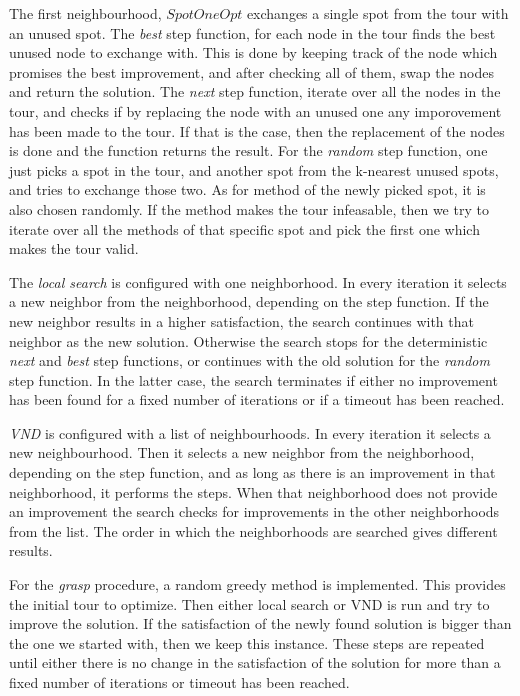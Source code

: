 \documentclass{article}
\begin{document}
The first neighbourhood, $SpotOneOpt$ exchanges a single spot from the tour with an unused spot. The \emph{best} step function, for each node in the tour finds the best unused node to exchange with. This is done by keeping track of the node which promises the best improvement, and after checking all of them, swap the nodes and return the solution. The \emph{next} step function, iterate over all the nodes in the tour, and checks if by replacing the node with an unused one any imporovement has been made to the tour. If that is the case, then the replacement of the nodes is done and the function returns the result. For the \emph{random} step function, one just picks a spot in the tour, and another spot from the k-nearest unused spots, and tries to exchange those two. As for method of the newly picked spot, it is also chosen randomly. If the method makes the tour infeasable, then we try to iterate over all the methods of that specific spot and pick the first one which makes the tour valid.
\medskip

The \emph{local search} is configured with one neighborhood. In every iteration it selects a new neighbor from the neighborhood, depending on the
step function. If the new neighbor results in a higher satisfaction, the search continues with that neighbor as the new solution. Otherwise
the search stops for the deterministic \emph{next} and \emph{best} step functions, or continues with the old solution for the \emph{random}
step function. In the latter case, the search terminates if either no improvement has been found for a fixed number of iterations or if a
timeout has been reached.
\medskip

\emph{VND} is configured with a list of neighbourhoods.  In every iteration it selects a new neighbourhood. Then it selects a new neighbor from the neighborhood, depending on the step function, and as long as there is an improvement in that neighborhood, it performs the steps. When that neighborhood does not provide an improvement the search checks for improvements in the other neighborhoods from the list. The order in which the neighborhoods are searched gives different results.  

For the \emph{grasp} procedure, a random greedy method is implemented. This provides the initial tour to optimize. Then either local search or VND is run and try to improve the solution. If the satisfaction of the newly found solution is bigger than the one we started with, then we keep this instance. These steps are repeated until either there is no change in the satisfaction of the solution for more than a fixed number of iterations or timeout has been reached.  
\end{document}

